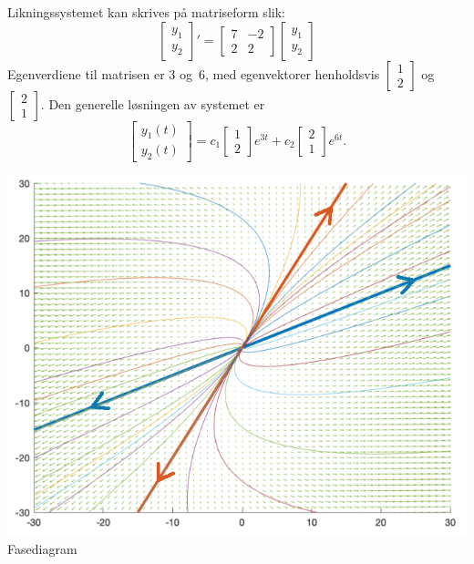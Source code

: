 \documentclass[notitlepage,a4paper,12pt,norsk]{IMFeksamen}
\newcommand{\vv}[2]{\begin{bmatrix} #1 \\ #2 \end{bmatrix}}
\newcommand{\vvS}[2]{\left[ \begin{smallmatrix} #1 \\ #2 \end{smallmatrix} \right]}
\newcommand{\0}{\V{0}}
\newcommand{\oppgslutt}{
\begin{center}
\pgfornament[width=6cm]{88}
\end{center}
}
\begin{document}
\begin{minipage}[t]{.5\textwidth}
\begin{oppgave}
Likningssystemet kan skrives på matriseform slik:
\[
\begin{bmatrix}
y_1  \\
y_2
\end{bmatrix}'
=
\begin{bmatrix}
7 & -2  \\
2 & 2 
\end{bmatrix}
\begin{bmatrix}
y_1  \\
y_2 
\end{bmatrix}
\]
Egenverdiene til matrisen er $3$ og~$6$,
med egenvektorer henholdsvis
$\vvS{1}{2}$ og~$\vvS{2}{1}$.
Den generelle løsningen av systemet er
\[
\vv{y_1(t)}{y_2(t)} =
c_1 \vv{1}{2} e^{3t}
+ 
c_2 \vv{2}{1}  e^{6t}.
\]
\end{oppgave}
\end{minipage}
\hfill
\begin{minipage}[t]{.4\textwidth}
\begin{center}
\includegraphics[scale=.35]{fasediagram}\\
Fasediagram
\end{center}
\end{minipage}
\vspace{-20pt}
\oppgslutt
\end{document}
